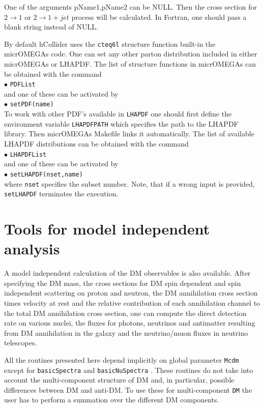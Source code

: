 \documentclass[12pt,a4paper]{article}
\begin{document}
{  One of the arguments pName1,pName2 can be NULL. Then the cross section for $2\to1$   or $2\to1 + jet $
process will be calculated. In Fortran,  one should pass
a blank string instead of NULL. 

By default hCollider uses the {\tt cteq6l} structure function built-in
the micrOMEGAs code. One can set any other parton distribution included in
either micrOMEGAs or LHAPDF.  The list  of structure functions in micrOMEGAs can be
obtained with the command \\
$\bullet$ \verb|PDFList| \\
and one of these can be activated by\\ 
$\bullet$ \verb|setPDF(name)|\\
To work with other PDF's available in {\tt LHAPDF}  one should first define the environment
variable {\tt LHAPDFPATH}  which specifies the path to the LHAPDF library. Then
micrOMEGAs Makefile  links it automatically. The list of available LHAPDF
distributions can be obtained with the command\\
$\bullet$ \verb|LHAPDFList|\\
and one of these can be activated by \\
$\bullet$ \verb|setLHAPDF(nset,name)|\\
where {\tt nset} specifies the subset number. Note, that if a wrong input is provided, 
\verb|setLHAPDF| terminates the execution.

 


\section{Tools for model independent analysis}

A model independent calculation of the DM observables is also available.
After specifying the DM mass, the cross sections for DM  spin dependent and  spin independent scattering on proton and neutron, the DM annihilation cross section times velocity at rest and the relative contribution of  each annihilation channel to the total DM annihilation cross section, one can compute the direct detection rate on   various nuclei, the fluxes for photons, neutrinos and antimatter resulting from DM annihilation in the galaxy and the neutrino/muon fluxes in neutrino telescopes.  

All the routines presented here 
depend implicitly on  global parameter {\tt Mcdm} except for {\tt basicSpectra} and {\tt basicNuSpectra} . These routines do not   take
into account the multi-component structure of DM and, in particular, possible   
differences between DM and anti-DM.   To use  these 
for multi-component {\tt DM} the user has to perform a summation over the different DM components. 
   
}
\end{document}

